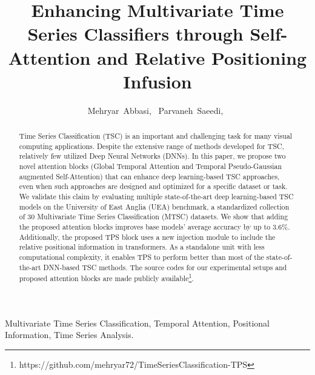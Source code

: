 \documentclass[journal]{IEEEtran}
\begin{document}
\title{Enhancing Multivariate Time Series Classifiers through Self-Attention and Relative Positioning Infusion}


\author{Mehryar~Abbasi,~
        Parvaneh~Saeedi,~



}


















\maketitle

\begin{abstract}
Time Series Classification (TSC) is an important and challenging task for many visual computing applications. Despite the extensive range of methods developed for TSC, relatively few utilized Deep Neural Networks (DNNs). In this paper, we propose two novel attention blocks (Global Temporal Attention and Temporal Pseudo-Gaussian augmented Self-Attention) that can enhance deep learning-based TSC approaches, even when such approaches are designed and optimized for a specific dataset or task. We validate this claim by evaluating multiple state-of-the-art deep learning-based TSC models on the University of East Anglia (UEA) benchmark, a standardized collection of 30 Multivariate Time Series Classification (MTSC) datasets. We show that adding the proposed attention blocks improves base models' average accuracy by up to 3.6\%. Additionally, the proposed TPS block uses a new injection module to include the relative positional information in transformers. As a standalone unit with less computational complexity, it enables TPS to perform better than most of the state-of-the-art DNN-based TSC methods. The source codes for our experimental setups and proposed attention blocks are made publicly available\footnote{https://github.com/mehryar72/TimeSeriesClassification-TPS}.


\end{abstract}

\begin{IEEEkeywords}
Multivariate Time Series Classification, Temporal Attention, Positional Information, Time Series Analysis.
\end{IEEEkeywords}
\end{document}
